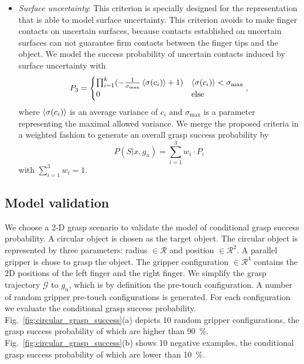 \begin{itemize}
\item \textit{Surface uncertainty}:
 This criterion is specially designed for the representation that is able to model surface uncertainty. This criterion avoids to make finger contacts on uncertain surfaces, because contacts established on uncertain surfaces can not guarantee firm contacts between the finger tips and the object. We model the success probability of uncertain contacts induced by surface uncertainty with 
\begin{equation}
 P_3 =  \begin{cases}
\prod_{i=1}^{k}(-\frac{1}{\sigma_{\text{max}} } \left< \sigma(c_i) \right>  + 1 )  &  \left< \sigma(c_i) \right> < \sigma_{\text{max}}\\
  0   & \text{else}
\end{cases},
\end{equation} 
where $\left< \sigma(c_i) \right> $ is an average variance of $c_i$ and $\sigma_{\text{max}}$ is a parameter representing the maximal allowed variance. We merge the proposed  criteria in a weighted fashion to generate an overall grasp success probability by  
\begin{equation}
P(S | x , g_n) =  \sum_{i=1}^3 w_i \cdot P_i
\end{equation} 
with $\sum_{i=1}^3 w_i  = 1$.
\end{itemize}

\subsection{Model validation}
We choose a 2-D grasp scenario to validate the model of  conditional grasp success probability. A circular object is chosen as the target object. The circular object is represented by three parameters: radius $\in \mathcal{R}$ and position $\in \mathcal{R}^2$. A parallel gripper is chose to grasp the object. The gripper configuration $\in \mathcal{R}^4$ contains the 2D positions of the left finger and the right finger. We simplify the grasp trajectory $\mathcal{G}$ to $g_n$, which is by definition the pre-touch configuration.  A number of random gripper pre-touch configurations is generated. For each configuration we evaluate the conditional grasp success probability. Fig.~\ref{fig:circular_grasp_success}(a) depicts 10 random gripper configurations, the grasp success probability of which are higher than 90~$\%$. Fig.~\ref{fig:circular_grasp_success}(b) shows 10 negative examples, the conditional grasp success probability of which are lower than 10~$\%$. 

